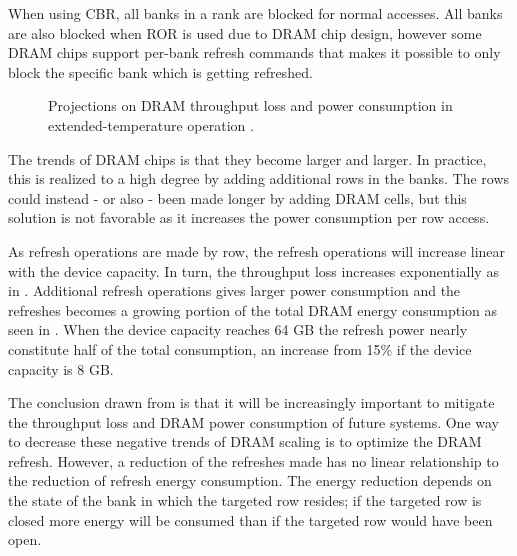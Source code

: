 When using CBR, all banks in a rank are blocked for normal accesses. All banks are also blocked when ROR is used due to DRAM chip design, however some DRAM chips support per-bank refresh commands that makes it possible to only block the specific bank which is getting refreshed. 

\begin{figure}[t]
    \centering
    \caption{Projections on DRAM throughput loss and power consumption in extended-temperature operation \cite{raidr}.}
    \label{fig:dram_data_proj}
\end{figure}

The trends of DRAM chips is that they become larger and larger. In practice, this is realized to a high degree by adding additional rows in the banks. The rows could instead - or also - been made longer by adding DRAM cells, but this solution is not favorable as it increases the power consumption per row access. 

As refresh operations are made by row, the refresh operations will increase linear with the device capacity. In turn, the throughput loss increases exponentially as in . Additional refresh operations gives larger power consumption and the refreshes becomes a growing portion of the total DRAM energy consumption as seen in . When the device capacity reaches 64 GB the refresh power nearly constitute half of the total consumption, an increase from 15\% if the device capacity is 8 GB. 

The conclusion drawn from  is that it will be increasingly important to mitigate the throughput loss and DRAM power consumption of future systems. One way to decrease these negative trends of DRAM scaling is to optimize the DRAM refresh. However, a reduction of the refreshes made has no linear relationship to the reduction of refresh energy consumption. The energy reduction depends on the state of the bank in which the targeted row resides; if the targeted row is closed more energy will be consumed than if the targeted row would have been open.